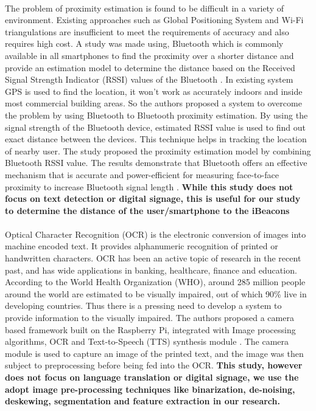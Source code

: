 \documentclass[12pt]{article}
\begin{document}
\paragraph{} The problem of proximity estimation is found to be difficult in a variety of environment. Existing approaches such as Global Positioning System and Wi-Fi triangulations are insufficient to meet the requirements of accuracy and also requires high cost. A study was made using, Bluetooth which is commonly available in all smartphones to find the proximity over a shorter distance and provide an estimation model to determine the distance based on the Received Signal Strength Indicator (RSSI) values of the Bluetooth  \cite{distance}. In existing system GPS is used to find the location, it won't work as accurately indoors and inside most commercial building areas. So the authors proposed a system to overcome the problem by using Bluetooth to Bluetooth proximity estimation. By using the signal strength of the Bluetooth device, estimated RSSI value is used to find out exact distance between the devices. This technique helps in tracking the location of nearby user. The study proposed the proximity estimation model by combining Bluetooth RSSI value. The results demonstrate that Bluetooth offers an effective mechanism that is accurate and power-efficient for measuring face-to-face proximity to increase Bluetooth signal length \cite{distance}. \textbf{While this study does not focus on text detection or digital signage, this is  useful for our study to determine the distance of the user/smartphone to the iBeacons} 

\paragraph{}Optical Character Recognition (OCR) is the electronic conversion of images into machine encoded text. It provides alphanumeric recognition of printed or handwritten characters. OCR has been an active topic of research in the recent past, and has wide applications in banking, healthcare, finance and education. According to the World Health Organization (WHO), around 285 million people around the world are estimated to be visually impaired, out of which 90\% live in developing countries. Thus there is a pressing need to develop a system to provide information to the visually impaired. The authors  proposed a camera based framework built on the Raspberry Pi, integrated with Image processing algorithms, OCR and Text-to-Speech (TTS) synthesis module \cite{ocr}. The camera module is used to capture an image of the printed text, and the image was then subject to preprocessing before being fed into the OCR.\cite{ocr} \textbf{This study, however does not focus on language translation or digital signage, we use the adopt image pre-processing techniques like binarization, de-noising, deskewing, segmentation and feature extraction in our research.}
\end{document}
